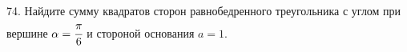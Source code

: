74. Найдите сумму квадратов сторон равнобедренного треугольника с углом при вершине $\alpha=\cfrac{\pi}{6}$ и стороной основания $a=1.$\\
